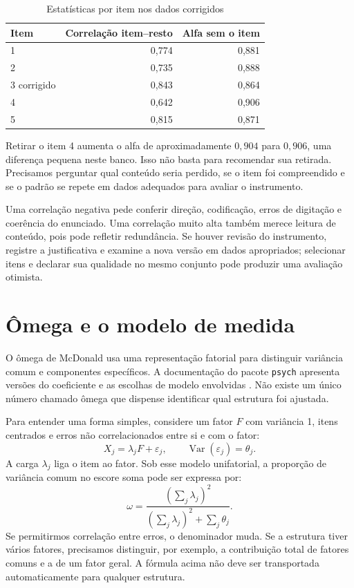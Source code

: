 \begin{table}[H]
\centering
\caption{Estatísticas por item nos dados corrigidos}
\begin{tabular}{lrr}
\hline
Item & Correlação item--resto & Alfa sem o item \\
\hline
1 & 0,774 & 0,881 \\
2 & 0,735 & 0,888 \\
3 corrigido & 0,843 & 0,864 \\
4 & 0,642 & 0,906 \\
5 & 0,815 & 0,871 \\
\hline
\end{tabular}
\label{tab:itens-confiabilidade}
\end{table}

Retirar o item 4 aumenta o alfa de aproximadamente $0{,}904$ para $0{,}906$, uma diferença pequena neste banco. Isso não basta para recomendar sua retirada. Precisamos perguntar qual conteúdo seria perdido, se o item foi compreendido e se o padrão se repete em dados adequados para avaliar o instrumento.

Uma correlação negativa pede conferir direção, codificação, erros de digitação e coerência do enunciado. Uma correlação muito alta também merece leitura de conteúdo, pois pode refletir redundância. Se houver revisão do instrumento, registre a justificativa e examine a nova versão em dados apropriados; selecionar itens e declarar sua qualidade no mesmo conjunto pode produzir uma avaliação otimista.

\section{Ômega e o modelo de medida}

O ômega de McDonald usa uma representação fatorial para distinguir variância comum e componentes específicos. A documentação do pacote \texttt{psych} apresenta versões do coeficiente e as escolhas de modelo envolvidas \parencite{RevelleOmega}. Não existe um único número chamado ômega que dispense identificar qual estrutura foi ajustada.

Para entender uma forma simples, considere um fator $F$ com variância 1, itens centrados e erros não correlacionados entre si e com o fator:
\[
X_j=\lambda_jF+\varepsilon_j,\qquad
\operatorname{Var}(\varepsilon_j)=\theta_j.
\]
A carga $\lambda_j$ liga o item ao fator. Sob esse modelo unifatorial, a proporção de variância comum no escore soma pode ser expressa por:
\[
\omega=\frac{\left(\sum_j\lambda_j\right)^2}
{\left(\sum_j\lambda_j\right)^2+\sum_j\theta_j}.
\]
Se permitirmos correlação entre erros, o denominador muda. Se a estrutura tiver vários fatores, precisamos distinguir, por exemplo, a contribuição total de fatores comuns e a de um fator geral. A fórmula acima não deve ser transportada automaticamente para qualquer estrutura.

